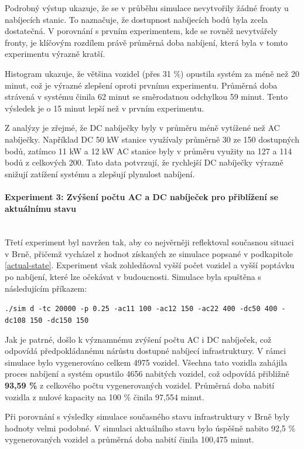 \documentclass[a4paper,11pt]{article}
\begin{document}
Podrobný výstup ukazuje, že se v průběhu simulace nevytvořily žádné fronty u nabíjecích stanic. To naznačuje, že dostupnost nabíjecích bodů byla zcela dostatečná. V porovnání s prvním experimentem, kde se rovněž nevytvářely fronty, je klíčovým rozdílem právě průměrná doba nabíjení, která byla v tomto experimentu výrazně kratší.

Histogram ukazuje, že většina vozidel (přes 31 \%) opustila systém za méně než 20 minut, což je výrazné zlepšení oproti prvnímu experimentu. Průměrná doba strávená v systému činila 62 minut se směrodatnou odchylkou 59 minut. Tento výsledek je o 15 minut lepší než v prvním experimentu.

Z analýzy je zřejmé, že DC nabíječky byly v průměru méně vytížené než AC nabíječky. Například DC 50 kW stanice využívaly průměrně 30 ze 150 dostupných bodů, zatímco 11 kW a 12 kW AC stanice byly v průměru využity na 127 a 114 bodů z celkových 200. Tato data potvrzují, že rychlejší DC nabíječky výrazně snižují zatížení systému a zlepšují plynulost nabíjení.


\paragraph{Experiment 3: Zvýšení počtu AC a DC nabíječek pro přiblížení se aktuálnímu stavu\\\\}
Třetí experiment byl navržen tak, aby co nejvěrněji reflektoval současnou situaci v Brně, přičemž vycházel z hodnot
získaných ze simulace popsané v podkapitole \ref{actual-state}. Experiment však zohledňoval vyšší počet vozidel a
vyšší poptávku po nabíjení, které lze očekávat v budoucnosti. Simulace byla spuštěna s následujícím příkazem:

\texttt{./sim d -tc 20000 -p 0.25 -ac11 100 -ac12 150 -ac22 400 -dc50 400 -dc108 150 -dc150 150}

Jak je patrné, došlo k významnému zvýšení počtu AC i DC nabíječek, což odpovídá předpokládanému nárůstu dostupné
nabíjecí infrastruktury. V rámci simulace bylo vygenerováno celkem 4975 vozidel. Všechna tato vozidla zahájila proces
nabíjení a systém opustilo 4656 nabitých vozidel, což odpovídá přibližně \textbf{93,59 \%} z celkového počtu
vygenerovaných vozidel. Průměrná doba nabití vozidla z nulové kapacity na 100 \% činila 97,554 minut.

Při porovnání s výsledky simulace současného stavu infrastruktury v Brně byly hodnoty velmi podobné. V simulaci
aktuálního stavu bylo úspěšně nabito 92,5 \% vygenerovaných vozidel a průměrná doba nabití činila 100,475 minut.
\end{document}
